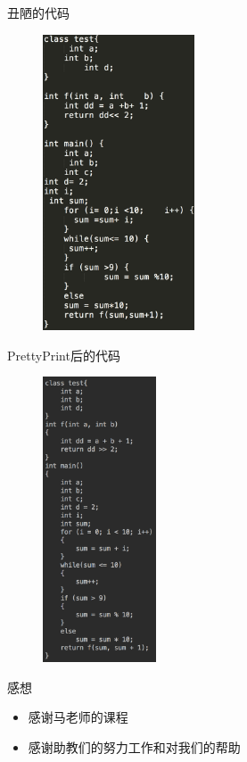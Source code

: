 \documentclass[UTF8]{beamer}
\begin{document}
\begin{frame}{丑陋的代码}
	\begin{figure}[htpb]
	\includegraphics[width=0.4\textwidth]{2.png}
	\end{figure}
\end{frame}

\begin{frame}{PrettyPrint后的代码}
	\begin{figure}[htpb]
	\includegraphics[width=0.3\textwidth]{3.png}
	\end{figure}
\end{frame}

\begin{frame}{感想}

\end{frame}

\begin{frame}
	\begin{itemize}
	\item 感谢马老师的课程
	\item 感谢助教们的努力工作和对我们的帮助
	\end{itemize}
\end{frame}
\end{document}
